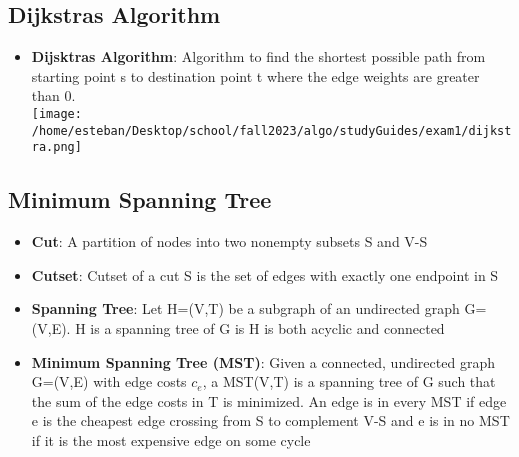 \documentclass[notitlepage]{article}
\begin{document}
    \subsection{Dijkstras Algorithm}
    \begin{itemize}
        \item \textbf{Dijsktras Algorithm}: Algorithm to find the shortest possible path from starting
            point s to destination point t where the edge weights are greater than 0. \\
\texttt{[image: /home/esteban/Desktop/school/fall2023/algo/studyGuides/exam1/dijkstra.png]}
    \end{itemize}

    \subsection{Minimum Spanning Tree}
    \begin{itemize}
        \item \textbf{Cut}: A partition of nodes into two nonempty subsets S and V-S
        \item \textbf{Cutset}: Cutset of a cut S is the set of edges with exactly one endpoint in S
        \item \textbf{Spanning Tree}: Let H=(V,T) be a subgraph of an undirected graph G=(V,E). 
            H is a spanning tree of G is H is both acyclic and connected
        \item \textbf{Minimum Spanning Tree (MST)}: Given a connected, undirected graph G=(V,E) with edge costs $c_e$, a
            MST(V,T) is a spanning tree of G such that the sum of the edge costs in T is minimized. An edge is 
            in every MST if edge e is the cheapest edge crossing from S to complement V-S and e is in no MST
            if it is the most expensive edge on some cycle
    \end{itemize}
\end{document}
